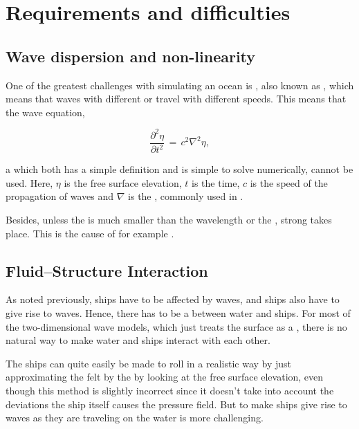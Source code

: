 \chapter{Requirements and difficulties}

\section{Wave dispersion and non-linearity}

One of the greatest challenges with simulating an ocean is , also known as , which means that waves with different \wavelengths or \frequencies travel with different speeds. This means that the wave equation,

\begin{equation} \label{eq:wave_equation}
\frac{\partial^2 \eta}{\partial t^2} \,=\, c^2\nabla^2\eta,
\end{equation}

a \PDE which both has a simple definition and is simple to solve numerically, cannot be used. Here, $\eta$ is the free surface elevation, $t$ is the time, $c$ is the speed of the propagation of waves and $\nabla$ is the , commonly used in .

Besides, unless the  is much smaller than the wavelength or the , strong  takes place. This is the cause of for example .

\section{Fluid--Structure Interaction}

As noted previously, ships have to be affected by waves, and ships also have to give rise to waves. Hence, there has to be a  between water and ships. For most of the two-dimensional wave models, which just treats the surface as a , there is no natural way to make water and ships interact with each other.

The ships can quite easily be made to roll in a realistic way by just approximating the  felt by the  by looking at the free surface elevation, even though this method is slightly incorrect since it doesn't take into account the deviations the ship itself causes the pressure field. But to make ships give rise to waves as they are traveling on the water is more challenging.

